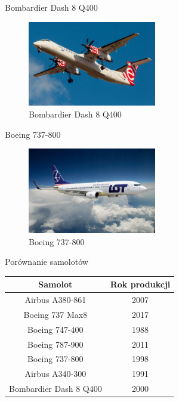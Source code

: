 \documentclass{beamer}
\begin{document}
\begin{frame}{Bombardier Dash 8 Q400}
\begin{figure}
    \centering
    \includegraphics[width=0.5\textwidth]{dash8.jpg}
    \caption{Bombardier Dash 8 Q400}
    \end{figure}
  \label{pic:pic6}
\end{frame}


\begin{frame}{Boeing 737-800}
\begin{figure}
    \centering
    \includegraphics[width=0.5\textwidth]{b7378.jpg}
    \caption{Boeing 737-800}
    \end{figure}
  \label{pic:pic7}
\end{frame}


\begin{frame}{Porównanie samolotów}
\centering
\begin{tabular}{|c|c|}
\hline
Samolot & Rok produkcji \\
\hline
Airbus A380-861 & 2007 \\
\hline
Boeing 737 Max8 & 2017 \\
\hline
Boeing 747-400 & 1988 \\
\hline
Boeing 787-900 & 2011 \\
\hline
Boeing 737-800 & 1998 \\
\hline
Airbus A340-300 & 1991 \\
\hline
Bombardier Dash 8 Q400 & 2000 \\
\hline
\end{tabular}
  \label{tab:tab1}
\end{frame}
\end{document}
